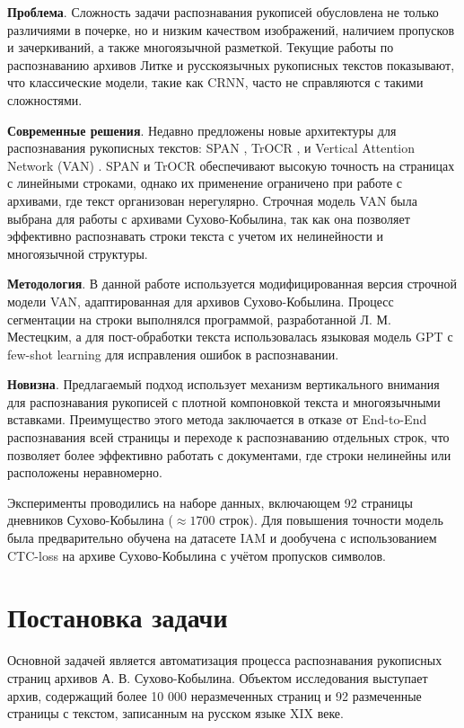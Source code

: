\documentclass{extarticle}
\begin{document}
\textbf{Проблема}. Сложность задачи распознавания рукописей обусловлена не только различиями в почерке, но и низким качеством изображений, наличием пропусков и зачеркиваний, а также многоязычной разметкой. Текущие работы по распознаванию архивов Литке \cite{peter_dataset, stepochkin} и русскоязычных рукописных текстов \cite{yandex} показывают, что классические модели, такие как CRNN, часто не справляются с такими сложностями.

\textbf{Современные решения}. Недавно предложены новые архитектуры для распознавания рукописных текстов: SPAN \cite{SPAN}, TrOCR \cite{TrOCR}, и Vertical Attention Network (VAN) \cite{VAN}. SPAN и TrOCR обеспечивают высокую точность на страницах с линейными строками, однако их применение ограничено при работе с архивами, где текст организован нерегулярно. Строчная модель VAN была выбрана для работы с архивами Сухово-Кобылина, так как она позволяет эффективно распознавать строки текста с учетом их нелинейности и многоязычной структуры.

\textbf{Методология}. В данной работе используется модифицированная версия строчной модели VAN, адаптированная для архивов Сухово-Кобылина. Процесс сегментации на строки выполнялся программой, разработанной Л. М. Местецким, а для пост-обработки текста использовалась языковая модель GPT с few-shot learning для исправления ошибок в распознавании.

\textbf{Новизна}. Предлагаемый подход использует механизм вертикального внимания для распознавания рукописей с плотной компоновкой текста и многоязычными вставками. Преимущество этого метода заключается в отказе от End-to-End распознавания всей страницы и переходе к распознаванию отдельных строк, что позволяет более эффективно работать с документами, где строки нелинейны или расположены неравномерно.

Эксперименты проводились на наборе данных, включающем 92 страницы дневников Сухово-Кобылина ($\approx 1700$ строк). Для повышения точности модель была предварительно обучена на датасете IAM и дообучена с использованием CTC-loss на архиве Сухово-Кобылина с учётом пропусков символов.


\section{Постановка задачи}

Основной задачей является автоматизация процесса распознавания рукописных страниц архивов А. В. Сухово-Кобылина. Объектом исследования выступает архив, содержащий более 10 000 неразмеченных страниц и 92 размеченные страницы с текстом, записанным на русском языке XIX веке.
\end{document}
